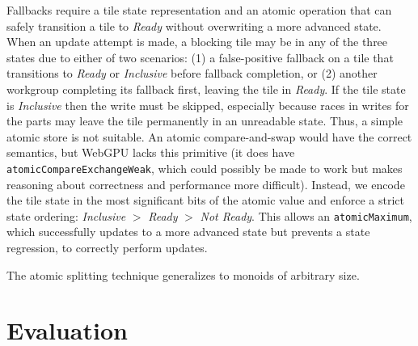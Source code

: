\documentclass[acmsmall, manuscript, screen, review, anonymous]{acmart}
\begin{document}
Fallbacks require a tile state representation and an atomic operation that can safely transition a tile to \emph{Ready} without overwriting a more advanced state. When an update attempt is made, a blocking tile may be in any of the three states due to either of two scenarios: (1) a false-positive fallback on a tile that transitions to \emph{Ready} or \emph{Inclusive} before fallback completion, or (2) another workgroup completing its fallback first, leaving the tile in \emph{Ready}. If the tile state is \emph{Inclusive} then the write must be skipped, especially because races in writes for the parts may leave the tile permanently in an unreadable state. Thus, a simple atomic store is not suitable. An atomic compare-and-swap would have the correct semantics, but WebGPU lacks this primitive (it does have \texttt{atomicCompareExchangeWeak}, which could possibly be made to work but makes reasoning about correctness and performance more difficult). Instead, we encode the tile state in the most significant bits of the atomic value and enforce a strict state ordering: \emph{Inclusive} $>$ \emph{Ready} $>$ \emph{Not Ready}. This allows an \texttt{atomicMaximum}, which successfully updates to a more advanced state but prevents a state regression, to correctly perform updates.

The atomic splitting technique generalizes to monoids of arbitrary size.

\section{Evaluation}
\end{document}

